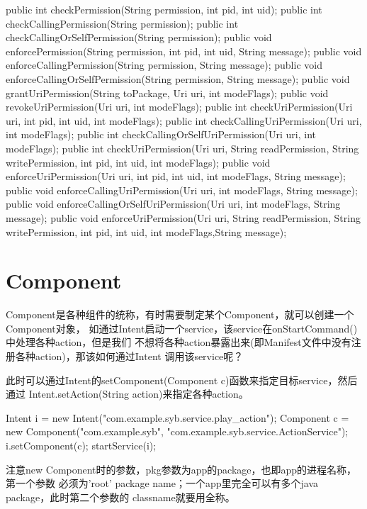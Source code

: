 ﻿\documentclass[a4paper,11pt]{article}
\begin{document}
\begin{javacode}
public int checkPermission(String permission, int pid, int uid);
public int checkCallingPermission(String permission);
public int checkCallingOrSelfPermission(String permission);
public void enforcePermission(String permission, int pid, int uid, String message);
public void enforceCallingPermission(String permission, String message);
public void enforceCallingOrSelfPermission(String permission, String message);
public void grantUriPermission(String toPackage, Uri uri, int modeFlags);
public void revokeUriPermission(Uri uri, int modeFlags);
public int checkUriPermission(Uri uri, int pid, int uid, int modeFlags);
public int checkCallingUriPermission(Uri uri, int modeFlags);
public int checkCallingOrSelfUriPermission(Uri uri, int modeFlags);
public int checkUriPermission(Uri uri, String readPermission,
            String writePermission, int pid, int uid, int modeFlags);
public void enforceUriPermission(Uri uri, int pid, int uid,
            int modeFlags, String message);
public void enforceCallingUriPermission(Uri uri, int modeFlags, String message);
public void enforceCallingOrSelfUriPermission(Uri uri, int modeFlags,
            String message);
public void enforceUriPermission(Uri uri, String readPermission,
            String writePermission, int pid, int uid, int modeFlags,String message);
\end{javacode}

\section[Component]{Component}
Component是各种组件的统称，有时需要制定某个Component，就可以创建一个Component对象，
如通过Intent启动一个service，该service在onStartCommand()中处理各种action，但是我们
不想将各种action暴露出来(即Manifest文件中没有注册各种action)，那该如何通过Intent
调用该service呢？

此时可以通过Intent的setComponent(Component c)函数来指定目标service，然后通过
Intent.setAction(String action)来指定各种action。

\begin{javacode}
Intent i = new Intent("com.example.syb.service.play_action");
Component c = new Component("com.example.syb", "com.example.syb.service.ActionService");
i.setComponent(c);
startService(i);
\end{javacode}

注意new Component时的参数，pkg参数为app的package，也即app的进程名称，第一个参数
必须为'root' package name；一个app里完全可以有多个java package，此时第二个参数的
classname就要用全称。
\end{document}
